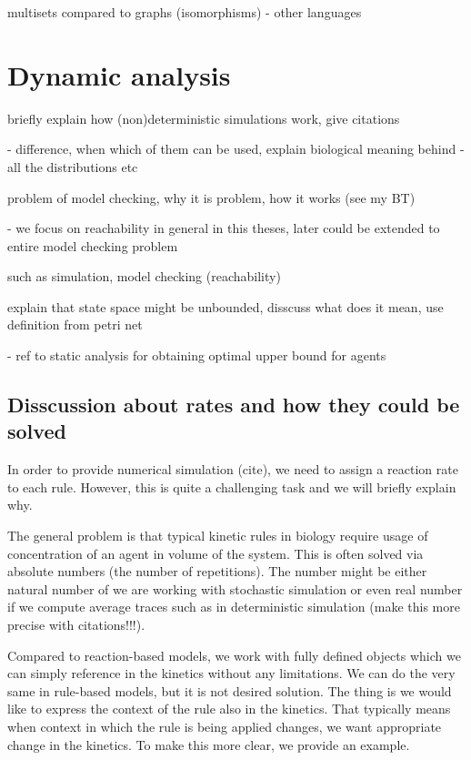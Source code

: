 \documentclass[12pt]{fithesis2}
\begin{document}
multisets compared to graphs (isomorphisms) - other languages

\section{Dynamic analysis}

briefly explain how (non)deterministic simulations work, give citations

 - difference, when which of them can be used, explain biological meaning behind
 - all the distributions etc

problem of model checking, why it is problem, how it works (see my BT) 

 - we focus on reachability in general in this theses, later could be extended to entire model checking problem

such as simulation, model checking (reachability)

explain that state space might be unbounded, disscuss what does it mean, use definition from petri net

 - ref to static analysis for obtaining optimal upper bound for agents

\subsection{Disscussion about rates and how they could be solved}

In order to provide numerical simulation (cite), we need to assign a reaction rate to each rule. However, this is quite a challenging task and we will briefly explain why.

The general problem is that typical kinetic rules in biology require usage of concentration of an agent in volume of the system. This is often solved via absolute numbers (the number of repetitions). The number might be either natural number of we are working with stochastic simulation or even real number if we compute average traces such as in deterministic simulation (make this more precise with citations!!!).

Compared to reaction-based models, we work with fully defined objects which we can simply reference in the kinetics without any limitations. We can do the very same in rule-based models, but it is not desired solution. The thing is we would like to express the context of the rule also in the kinetics. That typically means when context in which the rule is being applied changes, we want appropriate change in the kinetics. To make this more clear, we provide an example.
\end{document}

